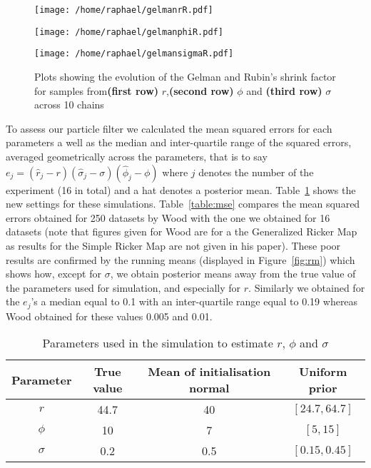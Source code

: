 \documentclass{article}
\begin{document}
	\begin{figure}[htb]
		\centering
		\begin{minipage}{0.6\textwidth}
			\centering
			\texttt{[image: /home/raphael/gelmanrR.pdf]}
		\end{minipage}
		\begin{minipage}{0.6\textwidth}
			\centering
			\texttt{[image: /home/raphael/gelmanphiR.pdf]}
		\end{minipage}
		\begin{minipage}{0.6\textwidth}
			\centering
			\texttt{[image: /home/raphael/gelmansigmaR.pdf]}
		\end{minipage}
		\caption{Plots showing the evolution of the  Gelman and Rubin's shrink factor for samples from\textbf{(first row)} $r$,\textbf{(second row)} $\phi$ and \textbf{(third row)} $\sigma$ across 10 chains}
		\label{fig:gelman}
	\end{figure}
	
\clearpage 

To assess our particle filter we calculated the mean squared errors for each parameters a well as the median and inter-quartile range of the squared errors, averaged geometrically across the parameters, that is to say $e_j = (\hat{r}_j-r)(\hat{\sigma}_j-\sigma)(\hat{\phi}_j-\phi)$ where $j$ denotes the number of the experiment (16 in total) and a hat denotes a posterior mean. Table~\ref{table:new} shows the new settings for these simulations. Table~\ref{table:mse} compares the mean squared errors obtained for 250 datasets by Wood with the one we obtained for 16 datasets (note that figures given for Wood are for a the Generalized Ricker Map as results for the Simple Ricker Map are not given in his paper). These poor results are confirmed by the running means (displayed in Figure~\ref{fig:rm}) which shows how, except for $\sigma$, we obtain posterior means away from the true value of the parameters used for simulation, and especially for $r$. Similarly we obtained for the $e_j$'s a median equal to 0.1 with an inter-quartile range equal to 0.19 whereas Wood obtained for these values 0.005 and 0.01.

	\begin{table}[htb]
		\centering
		\vspace{5mm}
		\begin{tabular}{c|c|c|c}
			Parameter & True value &  Mean of initialisation normal &  Uniform prior \\ \hline
			$r$ & 44.7 & 40 & $[24.7, 64.7]$\\ \hline
			$\phi$ & 10 & 7 & $[5, 15]$\\ \hline
			$\sigma$ & 0.2 &  0.5 & $[0.15, 0.45]$\\ \hline
		\end{tabular}
		\caption{Parameters used in the simulation to estimate $r$, $\phi$ and $\sigma$}
		\label{table:new}
		\vspace{5mm}
	\end{table}
\end{document}
